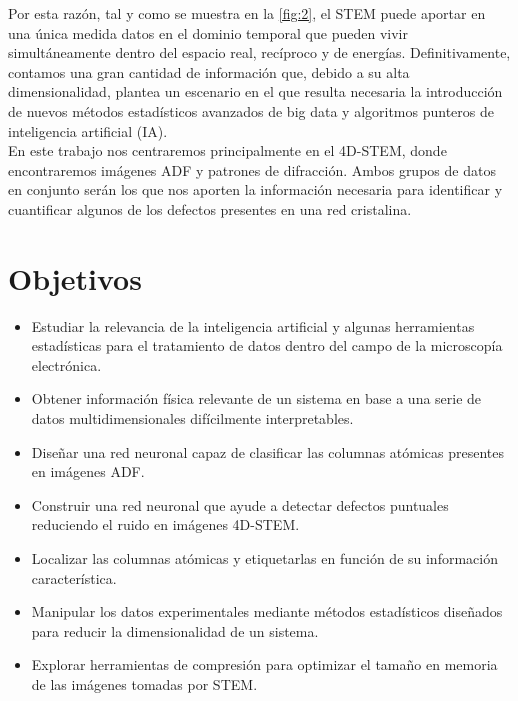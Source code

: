 \newpage
Por esta razón, tal y como se muestra en la \autoref{fig:2}, el STEM puede aportar en una única medida datos en el dominio temporal que pueden vivir simultáneamente dentro del espacio real, recíproco y de energías. Definitivamente, contamos una gran cantidad de información que, debido a su alta dimensionalidad, plantea un escenario en el que resulta necesaria la introducción de nuevos métodos estadísticos avanzados de big data y algoritmos punteros de inteligencia artificial (IA).\\


En este trabajo nos centraremos principalmente en el 4D-STEM, donde encontraremos imágenes ADF y patrones de difracción. Ambos grupos de datos en conjunto serán los que nos aporten la información necesaria para identificar y cuantificar algunos de los defectos presentes en una red cristalina.\\

\section*{Objetivos}
 \normalsize

\begin{itemize}
    \item Estudiar la relevancia de la inteligencia artificial y algunas herramientas estadísticas para el tratamiento de datos dentro del campo de la microscopía electrónica. %
    
    \item Obtener información física relevante de un sistema en base a una serie de datos multidimensionales difícilmente interpretables. %
    
    \item Diseñar una red neuronal capaz de clasificar las columnas atómicas presentes en imágenes ADF. %
    
    \item Construir una red neuronal que ayude a detectar defectos puntuales reduciendo el ruido en imágenes 4D-STEM. %
    
    \item Localizar las columnas atómicas y etiquetarlas en función de su información característica. %
    
    \item Manipular los datos experimentales mediante métodos estadísticos diseñados para reducir la dimensionalidad de un sistema. %
    
    \item Explorar herramientas de compresión para optimizar el tamaño en memoria de las imágenes tomadas por STEM. %
\end{itemize}
